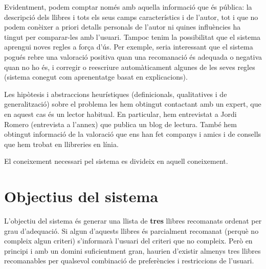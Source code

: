 Evidentment, podem comptar només amb aquella informació que és pública: la descripció dels llibres i tots els seus camps característics i de l'autor, tot i que no podem conèixer a priori detalls personals de l'autor ni quines influències ha tingut per comparar-les amb l'usuari. Tampoc tenim la possibilitat que el sistema aprengui noves regles a força d'ús. Per exemple, seria interessant que el sistema pogués rebre una valoració positiva quan una recomanació és adequada o negativa quan no ho és, i corregir o reescriure automàticament algunes de les seves regles (sistema conegut com aprenentatge basat en explicacions).

Les hipòtesis i abstraccions heurístiques (definicionals, qualitatives i de generalització) sobre el problema les hem obtingut contactant amb un expert, que en aquest cas és un lector habitual. En particular, hem entrevistat a Jordi Romero (entrevista a l'annex) que publica un blog de lectura. També hem obtingut informació de la valoració que ens han fet companys i amics i de consells que hem trobat en llibreries en línia.

El coneixement necessari pel sistema es divideix en aquell coneixement.


\section{Objectius del sistema}

L'objectiu del sistema és generar una llista de \textbf{tres} llibres recomanats ordenat per grau d'adequació. Si algun d'aquests llibres és parcialment recomanat (perquè no compleix algun criteri) s'informarà l'usuari del criteri que no compleix. Però en principi i amb un domini suficientment gran, haurien d'existir almenys tres llibres recomanables per qualsevol combinació de preferències i restriccions de l'usuari.





